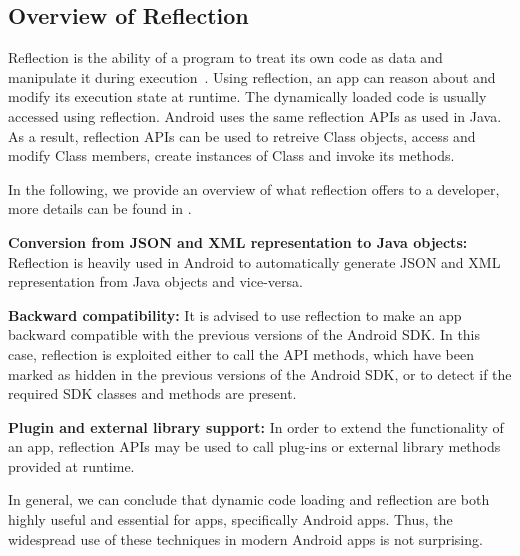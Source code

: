 \subsection{Overview of Reflection} Reflection is the ability of a program to treat its own code as data and manipulate it during execution~\cite{ClosInContext_Bobrow1993}. Using reflection, an app can reason about and modify its execution state at runtime. The dynamically loaded code is usually accessed using reflection. Android uses the same reflection APIs as used in Java. As a result, reflection APIs can be used to retreive Class objects, access and modify Class members, create instances of Class and invoke its methods. 


In the following, we provide an overview of what reflection offers to a developer, more details can be found in \cite{wognsen2014formalisation}. 


\textbf{Conversion from JSON and XML representation to Java objects:} Reflection is heavily used in Android to automatically generate JSON and XML representation from Java objects and vice-versa.

\textbf{Backward compatibility:} It is advised to use reflection to make an app backward compatible with the previous versions of the Android SDK. In this case, reflection is exploited either to call the API methods, which have been marked as hidden in the previous versions of the Android SDK, or to detect if the required SDK classes and methods are present.

\textbf{Plugin and external library support:} In order to extend the functionality of an app, reflection APIs may be used to call plug-ins or external library methods provided at runtime.       

In general, we can conclude that dynamic code loading and reflection are both highly useful and essential for apps, specifically Android apps. Thus, the widespread use of these techniques in modern Android apps is not surprising.



